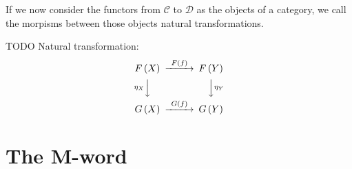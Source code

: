 \documentclass[11pt,a4paper]{scrartcl}
\newcommand{\of}[1]{\left(#1\right)}
\theoremstyle{plain}
\theoremstyle{definition}
\theoremstyle{remark}
\begin{document}
If we now consider the functors from $\mathcal{C}$ to $\mathcal{D}$ as the objects of a category, we call the morpisms between those objects natural transformations.

TODO Natural transformation:
\begin{displaymath}
\begin{CD}
	F\of X @>{F\of f}>> F\of Y \\
	@V{\eta_X}VV @VV{\eta_Y}V \\
	G\of X @>{G\of f}>> G\of Y
\end{CD}
\end{displaymath}

\section{The M-word}
\end{document}
